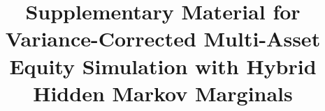 \documentclass[preprint,authoryear,doubleblind]{elsarticle}
\begin{document}
\begin{frontmatter}
\title{Supplementary Material for\\
Variance-Corrected Multi-Asset Equity Simulation with Hybrid Hidden Markov Marginals}
\end{frontmatter}

\appendix
{}
\renewcommand{\thesection}{S\arabic{section}}
\renewcommand{\thesubsection}{S\arabic{section}.\arabic{subsection}}
\renewcommand{\thefigure}{S\arabic{figure}}
\renewcommand{\thetable}{S\arabic{table}}
\renewcommand{\theequation}{S\arabic{equation}}
\setcounter{section}{0}
\setcounter{figure}{0}
\setcounter{table}{0}
\setcounter{equation}{0}





\end{document}
